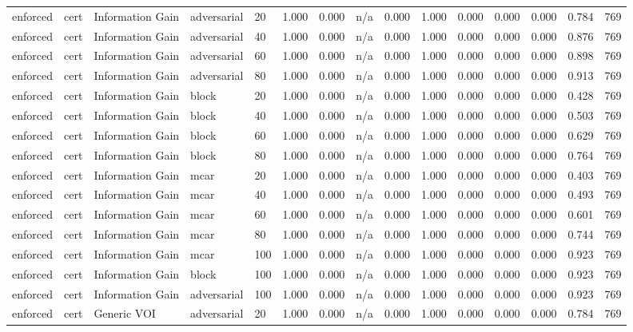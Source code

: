 \begin{table}[!ht]
{\begin{tabular}{lllllllllllllll}
enforced & cert & Information Gain & adversarial & 20 & 1.000 & 0.000 & n/a & 0.000 & 1.000 & 0.000 & 0.000 & 0.000 & 0.784 & 769 \\
enforced & cert & Information Gain & adversarial & 40 & 1.000 & 0.000 & n/a & 0.000 & 1.000 & 0.000 & 0.000 & 0.000 & 0.876 & 769 \\
enforced & cert & Information Gain & adversarial & 60 & 1.000 & 0.000 & n/a & 0.000 & 1.000 & 0.000 & 0.000 & 0.000 & 0.898 & 769 \\
enforced & cert & Information Gain & adversarial & 80 & 1.000 & 0.000 & n/a & 0.000 & 1.000 & 0.000 & 0.000 & 0.000 & 0.913 & 769 \\
enforced & cert & Information Gain & block & 20 & 1.000 & 0.000 & n/a & 0.000 & 1.000 & 0.000 & 0.000 & 0.000 & 0.428 & 769 \\
enforced & cert & Information Gain & block & 40 & 1.000 & 0.000 & n/a & 0.000 & 1.000 & 0.000 & 0.000 & 0.000 & 0.503 & 769 \\
enforced & cert & Information Gain & block & 60 & 1.000 & 0.000 & n/a & 0.000 & 1.000 & 0.000 & 0.000 & 0.000 & 0.629 & 769 \\
enforced & cert & Information Gain & block & 80 & 1.000 & 0.000 & n/a & 0.000 & 1.000 & 0.000 & 0.000 & 0.000 & 0.764 & 769 \\
enforced & cert & Information Gain & mcar & 20 & 1.000 & 0.000 & n/a & 0.000 & 1.000 & 0.000 & 0.000 & 0.000 & 0.403 & 769 \\
enforced & cert & Information Gain & mcar & 40 & 1.000 & 0.000 & n/a & 0.000 & 1.000 & 0.000 & 0.000 & 0.000 & 0.493 & 769 \\
enforced & cert & Information Gain & mcar & 60 & 1.000 & 0.000 & n/a & 0.000 & 1.000 & 0.000 & 0.000 & 0.000 & 0.601 & 769 \\
enforced & cert & Information Gain & mcar & 80 & 1.000 & 0.000 & n/a & 0.000 & 1.000 & 0.000 & 0.000 & 0.000 & 0.744 & 769 \\
enforced & cert & Information Gain & mcar & 100 & 1.000 & 0.000 & n/a & 0.000 & 1.000 & 0.000 & 0.000 & 0.000 & 0.923 & 769 \\
enforced & cert & Information Gain & block & 100 & 1.000 & 0.000 & n/a & 0.000 & 1.000 & 0.000 & 0.000 & 0.000 & 0.923 & 769 \\
enforced & cert & Information Gain & adversarial & 100 & 1.000 & 0.000 & n/a & 0.000 & 1.000 & 0.000 & 0.000 & 0.000 & 0.923 & 769 \\
enforced & cert & Generic VOI & adversarial & 20 & 1.000 & 0.000 & n/a & 0.000 & 1.000 & 0.000 & 0.000 & 0.000 & 0.784 & 769 \\

\end{tabular}}
\end{table}

